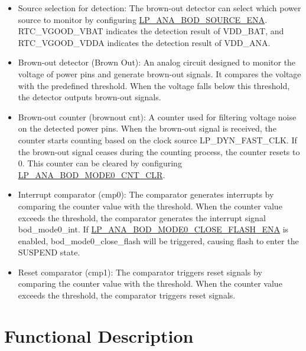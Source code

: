 \documentclass[main\_\_EN.tex]{subfiles}
\begin{document}
 \begin{itemize}
     \item Source selection for detection: The brown-out detector can select which power source to monitor by configuring \hyperref[fielddesc:LPANABODSOURCEENA]{LP\_ANA\_BOD\_SOURCE\_ENA}. RTC\_VGOOD\_VBAT indicates the detection result of VDD\_BAT, and RTC\_VGOOD\_VDDA indicates the detection result of VDD\_ANA.
     \item Brown-out detector (Brown Out): An analog circuit designed to monitor the voltage of power pins and generate brown-out signals. It compares the voltage with the predefined threshold. When the voltage falls below this threshold, the detector outputs brown-out signals.
     \item Brown-out counter (brownout cnt): A counter used for filtering voltage noise on the detected power pins. When the brown-out signal is received, the counter starts counting based on the clock source LP\_DYN\_FAST\_CLK. If the brown-out signal ceases during the counting process, the counter resets to 0. This counter can be cleared by configuring \hyperref[fielddesc:LPANABODMODE0CNTCLR]{LP\_ANA\_BOD\_MODE0\_CNT\_CLR}.
    \item Interrupt comparator (cmp0): The comparator generates interrupts by comparing the counter value with the threshold. When the counter value exceeds the threshold, the comparator generates the interrupt signal bod\_mode0\_int. If \hyperref[fielddesc:LPANABODMODE0CLOSEFLASHENA]{LP\_ANA\_BOD\_MODE0\_CLOSE\_FLASH\_ENA} is enabled, bod\_mode0\_close\_flash will be triggered, causing flash to enter the SUSPEND state.
     \item Reset comparator (cmp1): The comparator triggers reset signals by comparing the counter value with the threshold. When the counter value exceeds the threshold, the comparator triggers reset signals.
 \end{itemize}



\section{Functional Description}
\label{sec:brownout-func-descr}
\end{document}
